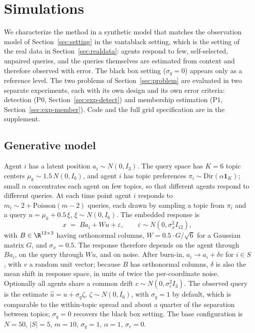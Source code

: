 \section{Simulations}
\label{sec:sims}

We characterize the method in a synthetic model that matches the observation model of Section~\ref{sec:setting} in the vantablack setting, which is the setting of the real data in Section~\ref{sec:realdata}: agents respond to few, self-selected, unpaired queries, and the queries themselves are estimated from context and therefore observed with error. The black box setting ($\sigma_q=0$) appears only as a reference level. The two problems of Section~\ref{sec:problem} are evaluated in two separate experiments, each with its own design and its own error criteria: detection (P0, Section~\ref{sec:exp-detect}) and membership estimation (P1, Section~\ref{sec:exp-member}). Code and the full grid specification are in the supplement.


\subsection{Generative model}
\label{sec:sim-model}

Agent $i$ has a latent position $a_i\sim N(0,I_3)$. The query space has $K=6$ topic centers $\mu_k\sim 1.5\,N(0,I_6)$, and agent $i$ has topic preferences $\pi_i\sim\mathrm{Dir}(\alpha\mathbf 1_K)$; small $\alpha$ concentrates each agent on few topics, so that different agents respond to different queries. At each time point agent $i$ responds to $m_i\sim 2+\mathrm{Poisson}(m-2)$ queries, each drawn by sampling a topic from $\pi_i$ and a query $u=\mu_k+0.5\,\xi$, $\xi\sim N(0,I_6)$. The embedded response is
\begin{equation}
x \;=\; B a_i + W u + \varepsilon, \qquad \varepsilon\sim N(0,\sigma_x^2 I_{12}),
\end{equation}
with $B\in\R^{12\times 3}$ having orthonormal columns, $W = 0.5\cdot G/\sqrt 6$ for a Gaussian matrix $G$, and $\sigma_x=0.5$. The response therefore depends on the agent through $Ba_i$, on the query through $Wu$, and on noise. After burn-in, $a_i\to a_i+\delta v$ for $i\in S$, with $v$ a random unit vector; because $B$ has orthonormal columns, $\delta$ is also the mean shift in response space, in units of twice the per-coordinate noise. Optionally all agents share a common drift $c\sim N(0,\sigma_c^2 I_3)$. The observed query is the estimate $\hat u = u+\sigma_q\zeta$, $\zeta\sim N(0,I_6)$, with $\sigma_q=1$ by default, which is comparable to the within-topic spread and about a quarter of the separation between topics; $\sigma_q=0$ recovers the black box setting. The base configuration is $N=50$, $|S|=5$, $m=10$, $\sigma_q=1$, $\alpha=1$, $\sigma_c=0$.

